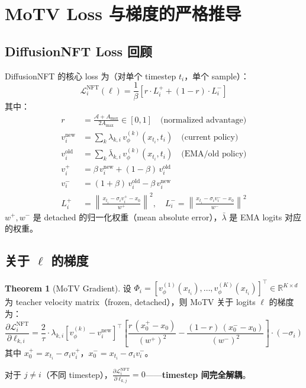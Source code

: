 \documentclass[11pt,a4paper]{article}
\newcommand{\loss}{\mathcal{L}}
\newcommand{\R}{\mathbb{R}}
\newcommand{\vphi}{v_\phi}
\newcommand{\adv}{\mathcal{A}}
\theoremstyle{definition}
\newtheorem{theorem}{Theorem}
\begin{document}
\section{MoTV Loss 与梯度的严格推导}
\label{sec:motv_loss}

\subsection{DiffusionNFT Loss 回顾}

DiffusionNFT 的核心 loss 为（对单个 timestep $t_i$，单个 sample）：
\begin{equation}
\loss^{\mathrm{NFT}}_i(\ell) = \frac{1}{\beta}\left[
r \cdot L^+_i + (1-r) \cdot L^-_i
\right]
\label{eq:nft_loss}
\end{equation}
其中：
\begin{align}
r &= \frac{\adv + A_{\max}}{2 A_{\max}} \in [0, 1] \quad\text{(normalized advantage)} \\
v^{\mathrm{new}}_i &= \sum_k \lambda_{k,i}\, \vphi^{(k)}(x_{t_i}, t_i) \quad\text{(current policy)} \\
v^{\mathrm{old}}_i &= \sum_k \bar{\lambda}_{k,i}\, \vphi^{(k)}(x_{t_i}, t_i) \quad\text{(EMA/old policy)} \\
v^+_i &= \beta\, v^{\mathrm{new}}_i + (1-\beta)\, v^{\mathrm{old}}_i \\
v^-_i &= (1+\beta)\, v^{\mathrm{old}}_i - \beta\, v^{\mathrm{new}}_i \\
L^+_i &= \left\|\frac{x_{t_i} - \sigma_i v^+_i - x_0}{w^+}\right\|^2, \quad
L^-_i = \left\|\frac{x_{t_i} - \sigma_i v^-_i - x_0}{w^-}\right\|^2
\end{align}
$w^+, w^-$ 是 detached 的归一化权重（mean absolute error），$\bar{\lambda}$ 是 EMA logits 对应的权重。

\subsection{关于 $\ell$ 的梯度}

\begin{theorem}[MoTV Gradient]
\label{thm:motv_grad}
设 $\Phi_i = [\vphi^{(1)}(x_{t_i}), \ldots, \vphi^{(K)}(x_{t_i})]^\top \in \R^{K \times d}$ 为 teacher velocity matrix（frozen, detached），则 MoTV 关于 logits $\ell$ 的梯度为：
\begin{equation}
\boxed{
\frac{\partial \loss^{\mathrm{NFT}}_i}{\partial \ell_{k,i}} =
\frac{2}{\tau} \cdot \lambda_{k,i}\left[\vphi^{(k)} - v^{\mathrm{new}}_i\right]^\top
\left[\frac{r\,(x_0^+ - x_0)}{(w^+)^2} - \frac{(1-r)\,(x_0^- - x_0)}{(w^-)^2}\right] \cdot (-\sigma_i)
}
\label{eq:motv_gradient}
\end{equation}
其中 $x_0^+ = x_{t_i} - \sigma_i v^+_i$，$x_0^- = x_{t_i} - \sigma_i v^-_i$。

对于 $j \neq i$（不同 timestep），$\frac{\partial \loss^{\mathrm{NFT}}_i}{\partial \ell_{k,j}} = 0$——\textbf{timestep 间完全解耦}。
\end{theorem}
\end{document}
